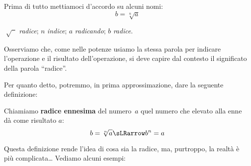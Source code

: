 Prima di tutto mettiamoci d'accordo su alcuni nomi:
\large
\[b=\sqrt[n]{a}\]
\begin{center} 
\(\sqrt[]{\phantom{a}}\) \quad \emph{radice}; \quad
\(n\) \quad \emph{indice}; \quad
\(a\) \quad \emph{radicando}; \quad
\(b\) \quad \emph{radice}.
\end{center}
\normalsize
Osserviamo che, come nelle potenze usiamo la stessa parola per indicare 
l'operazione e il risultato dell'operazione, si deve capire dal contesto il 
significato della parola ``radice''.

Per quanto detto, potremmo, in prima approssimazione,  dare la seguente 
definizione: 

\begin{definizione}
Chiamiamo \textbf{radice ennesima} del numero~\(a\) quel numero che 
elevato alla enne dà come risultato \(a\):
 \[b=\sqrt[n]{a} \sLRarrow b^n=a\]
\end{definizione}

Questa definizione rende l'idea di cosa sia la radice, ma, purtroppo, la 
realtà è più complicata\dots 
Vediamo alcuni esempi:

